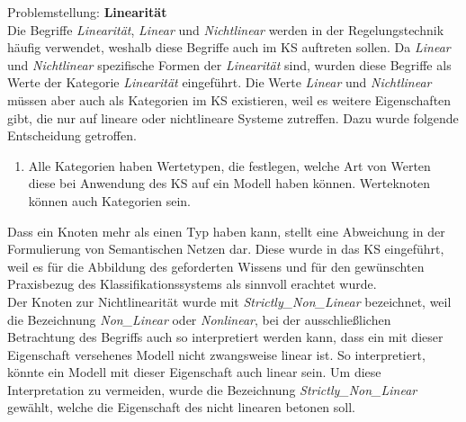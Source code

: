 Problemstellung: \textbf{Linearität}\\
Die Begriffe \textit{Linearität}, \textit{Linear} und \textit{Nichtlinear} werden in der Regelungstechnik häufig verwendet, weshalb diese Begriffe auch im KS auftreten sollen. Da \textit{Linear} und \textit{Nichtlinear} spezifische Formen der \textit{Linearität} sind, wurden diese Begriffe als Werte der Kategorie \textit{Linearität} eingeführt. Die Werte \textit{Linear} und \textit{Nichtlinear} müssen aber auch als Kategorien im KS existieren, weil es weitere Eigenschaften gibt, die nur auf lineare oder nichtlineare Systeme zutreffen. Dazu wurde folgende Entscheidung getroffen.
\begin{enumerate}[resume*]
	\item \label{E.KS_Werteknoten}Alle Kategorien haben Wertetypen, die festlegen, welche Art von Werten diese bei Anwendung des KS auf ein Modell haben können. Werteknoten können auch Kategorien sein.
\end{enumerate}
Dass ein Knoten mehr als einen Typ haben kann, stellt eine Abweichung in der Formulierung von Semantischen Netzen dar. Diese wurde in das KS eingeführt, weil es für die Abbildung des geforderten Wissens und für den gewünschten Praxisbezug des Klassifikationssystems als sinnvoll erachtet wurde.\\
Der Knoten zur Nichtlinearität wurde mit \textit{Strictly\_Non\_Linear} bezeichnet, weil die Bezeichnung \textit{Non\_Linear} oder \textit{Nonlinear}, bei der ausschließlichen Betrachtung des Begriffs auch so interpretiert werden kann, dass ein mit dieser Eigenschaft versehenes Modell nicht zwangsweise linear ist. So interpretiert, könnte ein Modell mit dieser Eigenschaft auch linear sein. Um diese Interpretation zu vermeiden, wurde die Bezeichnung \textit{Strictly\_Non\_Linear} gewählt, welche die Eigenschaft des nicht linearen betonen soll.\\ 

